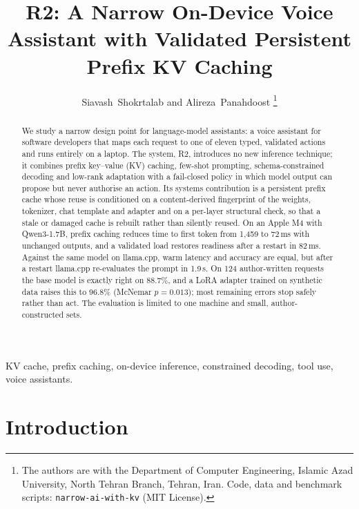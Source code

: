 \documentclass[journal]{IEEEtran}
\theoremstyle{definition}
\begin{document}
\title{R2: A Narrow On-Device Voice Assistant with Validated Persistent Prefix KV Caching}

\author{Siavash~Shokrtalab and Alireza~Panahdoost%
\thanks{The authors are with the Department of Computer Engineering, Islamic Azad University,
North Tehran Branch, Tehran, Iran. Code, data and benchmark scripts:
\texttt{narrow-ai-with-kv} (MIT License).}}

\maketitle

\begin{abstract}
We study a narrow design point for language-model assistants: a voice assistant for software
developers that maps each request to one of eleven typed, validated actions and runs entirely on a
laptop. The system, R2, introduces no new inference technique; it combines prefix key--value (KV)
caching, few-shot prompting, schema-constrained decoding and low-rank adaptation with a fail-closed
policy in which model output can propose but never authorise an action. Its systems contribution is
a persistent prefix cache whose reuse is conditioned on a content-derived fingerprint of the
weights, tokenizer, chat template and adapter and on a per-layer structural check, so that a stale
or damaged cache is rebuilt rather than silently reused. On an Apple M4 with Qwen3-1.7B, prefix
caching reduces time to first token from 1{,}459 to 72\,ms with unchanged outputs, and a validated
load restores readiness after a restart in 82\,ms. Against the same model on llama.cpp, warm latency
and accuracy are equal, but after a restart llama.cpp re-evaluates the prompt in 1.9\,s. On 124
author-written requests the base model is exactly right on 88.7\%, and a LoRA adapter trained on
synthetic data raises this to 96.8\% (McNemar $p=0.013$); most remaining errors stop safely rather
than act. The evaluation is limited to one machine and small, author-constructed sets.
\end{abstract}

\begin{IEEEkeywords}
KV cache, prefix caching, on-device inference, constrained decoding, tool use, voice assistants.
\end{IEEEkeywords}

\section{Introduction}
\end{document}
